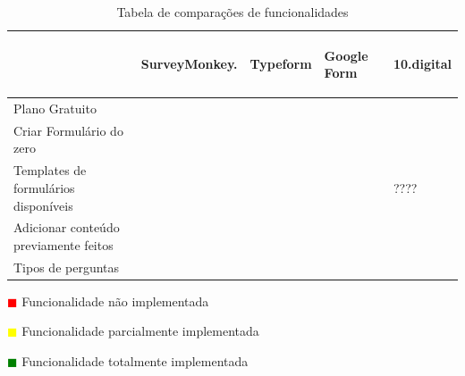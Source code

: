 	\renewcommand{\arraystretch}{2.5}
\setlength\arrayrulewidth{1.5pt}
\begin{table}[!ht]  
	\begin{center}
	\begin{tabular}{|p{4cm}|p{1.5cm}|p{1.5cm}|p{1.5cm}|p{1.5cm}|}
		\cline{2-5}
		\multicolumn{1}{c|}{} & \hspace{0.6cm}\begin{sideways}SurveyMonkey.\end{sideways} & \hspace{0.6cm}\begin{sideways}Typeform\end{sideways} & \hspace{0.6cm}\begin{sideways}Google Form\end{sideways} &\hspace{0.6cm}\begin{sideways} 10.digital\end{sideways}\\ \hline
		
		
			Plano Gratuito & \cellcolor{yellow!80}   & \cellcolor{yellow!80}  & \cellcolor{green!80} & \cellcolor{yellow!80}  \\ \hline
		
		Criar Formulário do zero & \cellcolor{green!80}  & \cellcolor{green!80}  & \cellcolor{green!80} & \cellcolor{green!80} \\ \hline
		
		Templates de formulários disponíveis& \cellcolor{green!80}  & \cellcolor{green!80} & \cellcolor{green!80} & ???? \\ \hline
		
		Adicionar conteúdo previamente feitos & \cellcolor{green!80}   & \cellcolor{red!80}  & \cellcolor{green!80} & \cellcolor{green!80}  \\ \hline
		
		Tipos de perguntas & \cellcolor{green!80}  & \cellcolor{green!80}  & \cellcolor{yellow!80} & \cellcolor{green!80}  \\ \hline
		
					
	\end{tabular}
\end{center}
		\hspace{1.2cm}	\textcolor{red}{$\blacksquare$} Funcionalidade não implementada
		
	   \hspace{1.2cm}     \textcolor{yellow}{$\blacksquare$} Funcionalidade parcialmente implementada
	   
	    \hspace{1.2cm}     \textcolor{green}{$\blacksquare$} Funcionalidade totalmente implementada 
	   \begin{center}
\caption{Tabela de comparações de funcionalidades}
\label{tab:comparacao1}
\end{center}
\end{table}

